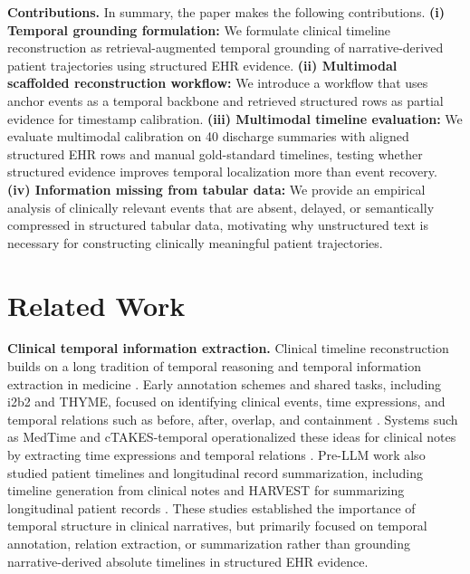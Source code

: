 \documentclass{ws-procs11x85}
\begin{document}
\textbf{Contributions.} In summary, the paper makes the following contributions. \textbf{(i) Temporal grounding formulation:} We formulate clinical timeline reconstruction as retrieval-augmented temporal grounding of narrative-derived patient trajectories using structured EHR evidence. \textbf{(ii) Multimodal scaffolded reconstruction workflow:} We introduce a workflow that uses anchor events as a temporal backbone and retrieved structured rows as partial evidence for timestamp calibration. \textbf{ (iii) Multimodal timeline evaluation:} We evaluate multimodal calibration on 40 discharge summaries with aligned structured EHR rows and manual gold-standard timelines, testing whether structured evidence improves temporal localization more than event recovery. \textbf{(iv) Information missing from tabular data:} We provide an empirical analysis of clinically relevant events that are absent, delayed, or semantically compressed in structured tabular data, motivating why unstructured text is necessary for constructing clinically meaningful patient trajectories.

\vspace{-0.75em}
\section{Related Work}
\label{sec:related_work}
\vspace{-0.25em}

\textbf{Clinical temporal information extraction.}
Clinical timeline reconstruction builds on a long tradition of temporal reasoning and temporal information extraction in medicine \cite{kohane1987temporal,zhou2007temporal}. Early annotation schemes and shared tasks, including i2b2 and THYME, focused on identifying clinical events, time expressions, and temporal relations such as before, after, overlap, and containment \cite{uzuner20112010,sun2013evaluating,sun2013annotating,styler2014temporal}. Systems such as MedTime and cTAKES-temporal operationalized these ideas for clinical notes by extracting time expressions and temporal relations \cite{lin2013medtime,savova2010mayo,lin2016multilayered}. Pre-LLM work also studied patient timelines and longitudinal record summarization, including timeline generation from clinical notes and HARVEST for summarizing longitudinal patient records \cite{nikfarjam2013towards,hirsch2015harvest}. These studies established the importance of temporal structure in clinical narratives, but primarily focused on temporal annotation, relation extraction, or summarization rather than grounding narrative-derived absolute timelines in structured EHR evidence.
\end{document}
